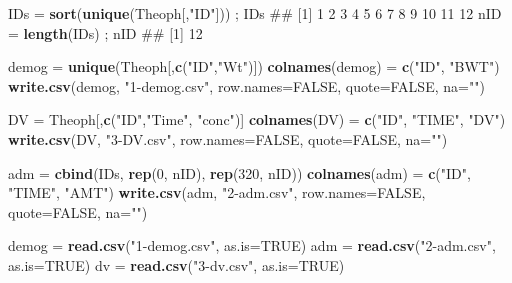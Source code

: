 \documentclass[10pt,]{krantz}
\makeatletter
\newenvironment{Shaded}{\begin{snugshade}}{\end{snugshade}}
\newcommand{\KeywordTok}[1]{\textcolor[rgb]{0.13,0.29,0.53}{\textbf{#1}}}
\newcommand{\DataTypeTok}[1]{\textcolor[rgb]{0.13,0.29,0.53}{#1}}
\newcommand{\DecValTok}[1]{\textcolor[rgb]{0.00,0.00,0.81}{#1}}
\newcommand{\StringTok}[1]{\textcolor[rgb]{0.31,0.60,0.02}{#1}}
\newcommand{\OtherTok}[1]{\textcolor[rgb]{0.56,0.35,0.01}{#1}}
\newcommand{\NormalTok}[1]{#1}
\newenvironment{kframe}{%
\medskip{}
\setlength{\fboxsep}{.8em}
 \def\at@end@of@kframe{}%
 \ifinner\ifhmode%
  \def\at@end@of@kframe{\end{minipage}}%
  \begin{minipage}{\columnwidth}%
 \fi\fi%
 \def\FrameCommand##1{\hskip\@totalleftmargin \hskip-\fboxsep
 \colorbox{shadecolor}{##1}\hskip-\fboxsep
     \hskip-\linewidth \hskip-\@totalleftmargin \hskip\columnwidth}%
 \MakeFramed {\advance\hsize-\width
   \@totalleftmargin\z@ \linewidth\hsize
   \@setminipage}}%
 {\par\unskip\endMakeFramed%
 \at@end@of@kframe}
\renewenvironment{Shaded}{\begin{kframe}}{\end{kframe}}
\theoremstyle{definition}
\theoremstyle{definition}
\theoremstyle{remark}
\makeatother
\begin{document}
\begin{Shaded}
\begin{Highlighting}[]
\NormalTok{IDs =}\StringTok{ }\KeywordTok{sort}\NormalTok{(}\KeywordTok{unique}\NormalTok{(Theoph[,}\StringTok{"ID"}\NormalTok{])) ; IDs}
\NormalTok{##  [1]  1  2  3  4  5  6  7  8  9 10 11 12}
\NormalTok{nID =}\StringTok{ }\KeywordTok{length}\NormalTok{(IDs) ; nID}
\NormalTok{## [1] 12}

\NormalTok{demog =}\StringTok{ }\KeywordTok{unique}\NormalTok{(Theoph[,}\KeywordTok{c}\NormalTok{(}\StringTok{"ID"}\NormalTok{,}\StringTok{"Wt"}\NormalTok{)])}
\KeywordTok{colnames}\NormalTok{(demog) =}\StringTok{ }\KeywordTok{c}\NormalTok{(}\StringTok{"ID"}\NormalTok{, }\StringTok{"BWT"}\NormalTok{)}
\KeywordTok{write.csv}\NormalTok{(demog, }\StringTok{"1-demog.csv"}\NormalTok{, }\DataTypeTok{row.names=}\OtherTok{FALSE}\NormalTok{, }\DataTypeTok{quote=}\OtherTok{FALSE}\NormalTok{, }\DataTypeTok{na=}\StringTok{""}\NormalTok{)}

\NormalTok{DV =}\StringTok{ }\NormalTok{Theoph[,}\KeywordTok{c}\NormalTok{(}\StringTok{"ID"}\NormalTok{,}\StringTok{"Time"}\NormalTok{, }\StringTok{"conc"}\NormalTok{)]}
\KeywordTok{colnames}\NormalTok{(DV) =}\StringTok{ }\KeywordTok{c}\NormalTok{(}\StringTok{"ID"}\NormalTok{, }\StringTok{"TIME"}\NormalTok{, }\StringTok{"DV"}\NormalTok{)}
\KeywordTok{write.csv}\NormalTok{(DV, }\StringTok{"3-DV.csv"}\NormalTok{, }\DataTypeTok{row.names=}\OtherTok{FALSE}\NormalTok{, }\DataTypeTok{quote=}\OtherTok{FALSE}\NormalTok{, }\DataTypeTok{na=}\StringTok{""}\NormalTok{)}

\NormalTok{adm =}\StringTok{ }\KeywordTok{cbind}\NormalTok{(IDs, }\KeywordTok{rep}\NormalTok{(}\DecValTok{0}\NormalTok{, nID), }\KeywordTok{rep}\NormalTok{(}\DecValTok{320}\NormalTok{, nID))}
\KeywordTok{colnames}\NormalTok{(adm) =}\StringTok{ }\KeywordTok{c}\NormalTok{(}\StringTok{"ID"}\NormalTok{, }\StringTok{"TIME"}\NormalTok{, }\StringTok{"AMT"}\NormalTok{)}
\KeywordTok{write.csv}\NormalTok{(adm, }\StringTok{"2-adm.csv"}\NormalTok{, }\DataTypeTok{row.names=}\OtherTok{FALSE}\NormalTok{, }\DataTypeTok{quote=}\OtherTok{FALSE}\NormalTok{, }\DataTypeTok{na=}\StringTok{""}\NormalTok{)}

\NormalTok{demog =}\StringTok{ }\KeywordTok{read.csv}\NormalTok{(}\StringTok{"1-demog.csv"}\NormalTok{, }\DataTypeTok{as.is=}\OtherTok{TRUE}\NormalTok{)}
\NormalTok{adm =}\StringTok{ }\KeywordTok{read.csv}\NormalTok{(}\StringTok{"2-adm.csv"}\NormalTok{, }\DataTypeTok{as.is=}\OtherTok{TRUE}\NormalTok{)}
\NormalTok{dv =}\StringTok{ }\KeywordTok{read.csv}\NormalTok{(}\StringTok{"3-dv.csv"}\NormalTok{, }\DataTypeTok{as.is=}\OtherTok{TRUE}\NormalTok{)}


\end{Highlighting}
\end{Shaded}
\end{document}
